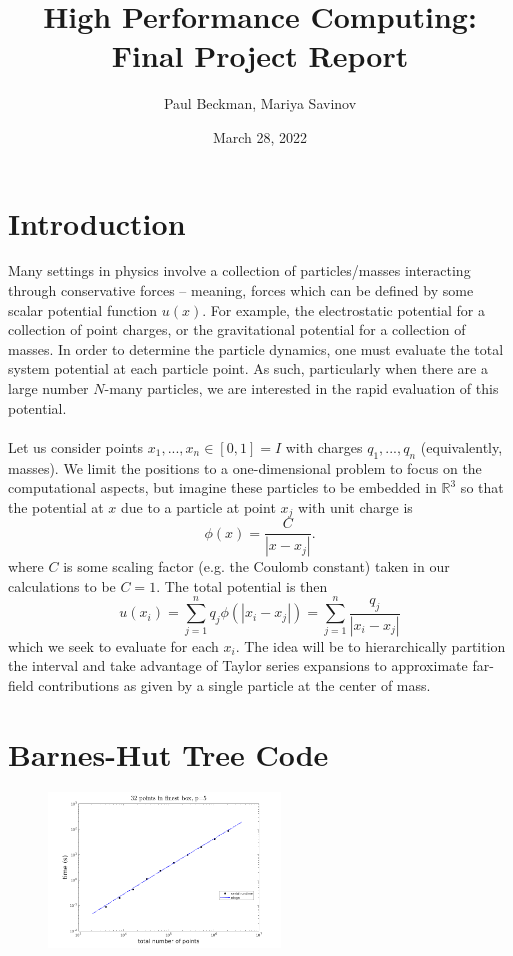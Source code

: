 \documentclass{article}
\title{High Performance Computing: Final Project Report}
\author{Paul Beckman, Mariya Savinov}
\date{March 28, 2022}
\newcommand{\abs}[1]{\left|#1\right|}
\newcommand{\R}{\mathbb{R}}
\newcommand {\beq} {\begin{equation}}
\newcommand {\eeq} {\end{equation}}
\begin{document}
\maketitle

\section{Introduction}
Many settings in physics involve a collection of particles/masses interacting through conservative forces -- meaning, forces which can be defined by some scalar potential function $u({x})$. For example, the electrostatic potential for a collection of point charges, or the gravitational potential for a collection of masses. In order to determine the particle dynamics, one must evaluate the total system potential at each particle point. As such, particularly when there are a large number $N$-many particles, we are interested in the rapid evaluation of this potential.\\\\
Let us consider points $x_1,...,x_n\in[0,1]=I$ with charges $q_1,...,q_n$ (equivalently, masses). We limit the positions to a one-dimensional problem to focus on the computational aspects, but imagine these particles to be embedded in $\R^3$ so that the potential at $x$ due to a particle at point $x_j$ with unit charge is
\beq
        \phi(x) = \frac{C}{\abs{x-x_j}}.
\eeq
where $C$ is some scaling factor (e.g. the Coulomb constant) taken in our calculations to be $C=1$. The total potential is then
\beq
        u(x_i) = \sum_{j=1}^n q_j \phi(\abs{x_i - x_j}) = \sum_{j=1}^n \dfrac{q_j}{\abs{x_i-x_j}}
\label{eq:potential}
\eeq
which we seek to evaluate for each $x_i$. The idea will be to hierarchically partition the interval and take advantage of Taylor series expansions to approximate far-field contributions as given by a single particle at the center of mass.

\section{Barnes-Hut Tree Code}
\begin{figure}
  \centering
  \includegraphics[width=0.55\textwidth]{./figures/varying_n_m32_p5.png}
\end{figure}
\end{document}
